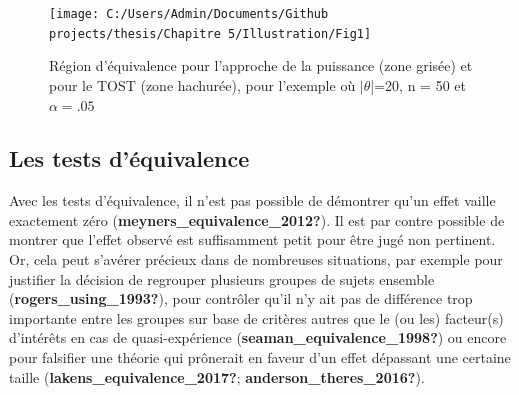 \documentclass[
  english,
  man]{apa6}
\begin{document}
\begin{figure}

{\centering \texttt{[image: C:/Users/Admin/Documents/Github projects/thesis/Chapitre 5/Illustration/Fig1]} 

}

\caption{Région d'équivalence pour l'approche de la puissance (zone grisée) et pour le TOST (zone hachurée), pour l'exemple où $|\theta$|=20, n = 50 et $\alpha=.05$}\label{fig:schuirman2}
\end{figure}

\hypertarget{les-tests-duxe9quivalence}{%
\subsection{Les tests d'équivalence}\label{les-tests-duxe9quivalence}}

Avec les tests d'équivalence, il n'est pas possible de démontrer qu'un effet vaille exactement zéro (\textbf{meyners\_equivalence\_2012?}). Il est par contre possible de montrer que l'effet observé est suffisamment petit pour être jugé non pertinent. Or, cela peut s'avérer précieux dans de nombreuses situations, par exemple pour justifier la décision de regrouper plusieurs groupes de sujets ensemble (\textbf{rogers\_using\_1993?}), pour contrôler qu'il n'y ait pas de différence trop importante entre les groupes sur base de critères autres que le (ou les) facteur(s) d'intérêts en cas de quasi-expérience (\textbf{seaman\_equivalence\_1998?}) ou encore pour falsifier une théorie qui prônerait en faveur d'un effet dépassant une certaine taille (\textbf{lakens\_equivalence\_2017?}; \textbf{anderson\_theres\_2016?}).
\end{document}
